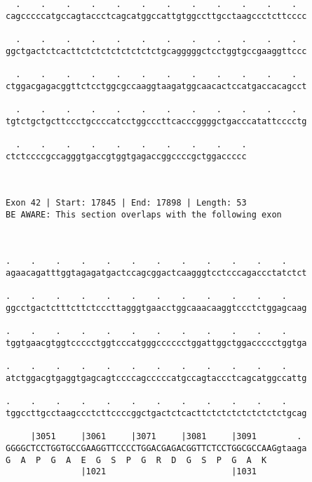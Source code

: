 \documentclass{article}
\begin{document}
\begin{Verbatim}
  .    .    .    .    .    .    .    .    .    .    .    .  
cagcccccatgccagtaccctcagcatggccattgtggccttgcctaagccctcttcccc
                                                            
  .    .    .    .    .    .    .    .    .    .    .    .  
ggctgactctcacttctctctctctctctctgcagggggctcctggtgccgaaggttccc
                                                            
  .    .    .    .    .    .    .    .    .    .    .    .  
ctggacgagacggttctcctggcgccaaggtaagatggcaacactccatgaccacagcct
                                                            
  .    .    .    .    .    .    .    .    .    .    .    .  
tgtctgctgcttccctgccccatcctggcccttcacccggggctgacccatattcccctg
                                                            
  .    .    .    .    .    .    .    .    .    .
ctctccccgccagggtgaccgtggtgagaccggccccgctggaccccc
                                                
                                                
 
Exon 42 | Start: 17845 | End: 17898 | Length: 53
BE AWARE: This section overlaps with the following exon



.    .    .    .    .    .    .    .    .    .    .    .    
agaacagatttggtagagatgactccagcggactcaagggtcctcccagaccctatctct
                                                            
.    .    .    .    .    .    .    .    .    .    .    .    
ggcctgactctttcttctcccttagggtgaacctggcaaacaaggtccctctggagcaag
                                                            
.    .    .    .    .    .    .    .    .    .    .    .    
tggtgaacgtggtccccctggtcccatgggcccccctggattggctggaccccctggtga
                                                            
.    .    .    .    .    .    .    .    .    .    .    .    
atctggacgtgaggtgagcagtccccagcccccatgccagtaccctcagcatggccattg
                                                            
.    .    .    .    .    .    .    .    .    .    .    .    
tggccttgcctaagccctcttccccggctgactctcacttctctctctctctctctgcag
                                                            
     |3051     |3061     |3071     |3081     |3091        . 
GGGGCTCCTGGTGCCGAAGGTTCCCCTGGACGAGACGGTTCTCCTGGCGCCAAGgtaaga
G  A  P  G  A  E  G  S  P  G  R  D  G  S  P  G  A  K        
               |1021                         |1031          
  

\end{Verbatim}
\end{document}
